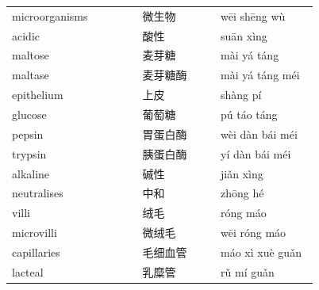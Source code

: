 \documentclass[11pt]{article}
\begin{document}
\begin{longtable}{@{}p{0.40\linewidth}p{0.24\linewidth}p{0.30\linewidth}@{}}
microorganisms & 微生物 & wēi shēng wù \\
acidic & 酸性 & suān xìng \\
maltose & 麦芽糖 & mài yá táng \\
maltase & 麦芽糖酶 & mài yá táng méi \\
epithelium & 上皮 & shàng pí \\
glucose & 葡萄糖 & pú táo táng \\
pepsin & 胃蛋白酶 & wèi dàn bái méi \\
trypsin & 胰蛋白酶 & yí dàn bái méi \\
alkaline & 碱性 & jiǎn xìng \\
neutralises & 中和 & zhōng hé \\
villi & 绒毛 & róng máo \\
microvilli & 微绒毛 & wēi róng máo \\
capillaries & 毛细血管 & máo xì xuè guǎn \\
lacteal & 乳糜管 & rǔ mí guǎn \\
\end{longtable}
\end{document}
